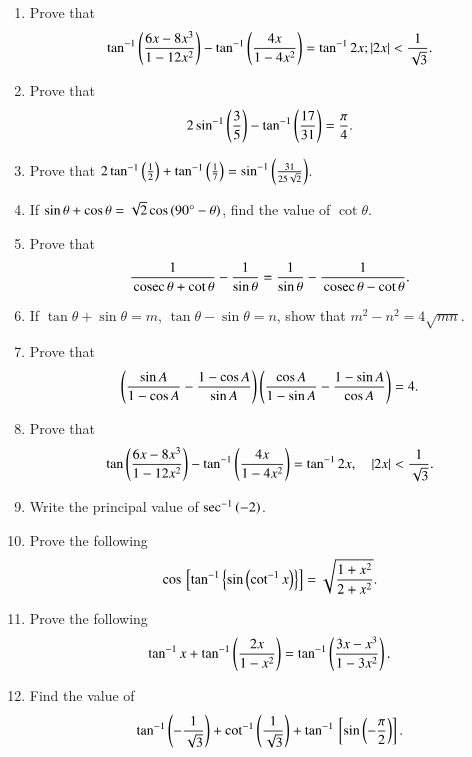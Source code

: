 \begin{enumerate}[label=\thesubsection.\arabic*,ref=\thesubsection.\theenumi,itemsep=1pt]
	\hfill{}
\item Prove that 
	\begin{align*}
	\tan^{-1} \left(\frac{6x-8x^{3}}{1-12x^{2}}\right) - \tan^{-1} \left(\frac{4x}{1-4x^{2}}\right) = \tan^{-1}2x;
		\left\vert2x\right\vert < \frac{1}{\sqrt{3}}
	.\end{align*}
 	\hfill{}\item Prove that 
	\begin{align*}
		2\sin^{-1}\left(\frac{3}{5}\right)-\tan^{-1}\left(\frac{17}{31}\right) = \frac{\pi}{4}
	.\end{align*}
	\hfill{}
\item Prove that $2\tan^{-1}\left(\frac{1}{2}\right)+\tan^{-1}\left(\frac{1}{7}\right) = \sin^{-1}\left(\frac{31}{25\sqrt{2}}\right)$. 
\hfill{}
\item If $\sin\theta+\cos\theta=\sqrt{2}\cos\left(90\degree{}-\theta\right)$, find the value of $\cot\theta$.
\hfill{}\item Prove that  $$\dfrac{1}{\,\text{cosec}\,\theta+\cot\theta}-\dfrac{1}{\sin\theta}=\dfrac{1}{\sin\theta}-\dfrac{1}{\,\text{cosec}\,\theta-\cot\theta}.$$
\hfill{}\item If $\tan\theta+\sin\theta=m$, $\tan\theta-\sin\theta=n$, show that $m^{2}-n^{2}=4\sqrt{mn}$.
\hfill{}\item Prove that  $$\left(\dfrac{\sin A}{1-\cos A}-\dfrac{1-\cos A}{\sin A}\right)\left(\dfrac{\cos A}{1-\sin A}-\dfrac{1-\sin A}{\cos A}\right)=4.$$
\hfill{}
\item Prove that $$\tan\left(\frac{6x-8x^3}{1-12x^2}\right)-\tan^{-1}\left(\frac{4x}{1-4x^2}\right)=\tan^{-1}2x, \quad |2x|<\frac{1}{\sqrt{3}}.$$
\hfill{}
\item Write the principal value of $\sec^{-1} \left(-2\right)$.
\hfill{}\item Prove the following
    \begin{align*}
        \cos {}\left[\tan^{-1} \left\{\sin \left(\cot^{-1} x\right)\right\}\right] = \sqrt{\frac{1 + x^2}{2 + x^2}}
    .\end{align*}
\hfill{}\item Prove the following
    \begin{align*}
        \tan^{-1} x + \tan^{-1} \left(\frac{2x}{1 - x^2}\right) = \tan^{-1} \left(\frac{3x - x^3}{1 - 3x^2}\right)
    .\end{align*}
\hfill{}
\item Find the value of $$\tan^{-1} \left(-\frac{1}{\sqrt{3}}\right) + \cot^{-1}\left(\frac{1}{\sqrt{3}}\right) + \tan^{-1}{}\left[\sin\left(-\frac{\pi}{2}\right)\right].$$

\end{enumerate}
